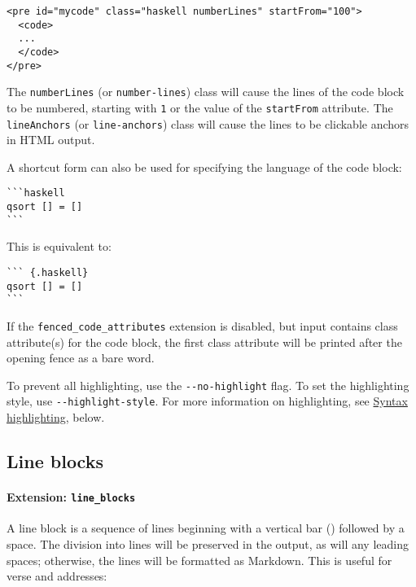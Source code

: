 \documentclass[
]{article}
\begin{document}
\begin{verbatim}
<pre id="mycode" class="haskell numberLines" startFrom="100">
  <code>
  ...
  </code>
</pre>
\end{verbatim}

The \texttt{numberLines} (or \texttt{number-lines}) class will cause the
lines of the code block to be numbered, starting with \texttt{1} or the
value of the \texttt{startFrom} attribute. The \texttt{lineAnchors} (or
\texttt{line-anchors}) class will cause the lines to be clickable
anchors in HTML output.

A shortcut form can also be used for specifying the language of the code
block:

\begin{verbatim}
```haskell
qsort [] = []
```
\end{verbatim}

This is equivalent to:

\begin{verbatim}
``` {.haskell}
qsort [] = []
```
\end{verbatim}

If the \texttt{fenced\_code\_attributes} extension is disabled, but
input contains class attribute(s) for the code block, the first class
attribute will be printed after the opening fence as a bare word.

To prevent all highlighting, use the \texttt{-\/-no-highlight} flag. To
set the highlighting style, use \texttt{-\/-highlight-style}. For more
information on highlighting, see
\protect\hyperlink{syntax-highlighting}{Syntax highlighting}, below.

\hypertarget{line-blocks}{%
\subsection{Line blocks}\label{line-blocks}}

\hypertarget{extension-line_blocks}{%
\paragraph{\texorpdfstring{Extension:
\texttt{line\_blocks}}{Extension: line\_blocks}}\label{extension-line_blocks}}

A line block is a sequence of lines beginning with a vertical bar
(\texttt{\textbar{}}) followed by a space. The division into lines will
be preserved in the output, as will any leading spaces; otherwise, the
lines will be formatted as Markdown. This is useful for verse and
addresses:
\end{document}
